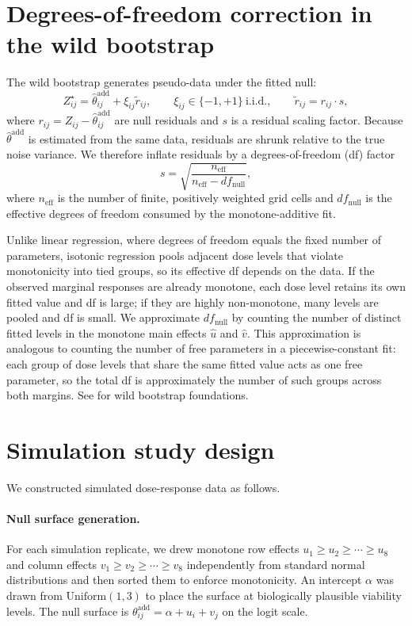 \documentclass[11pt]{article}
\begin{document}
\section{Degrees-of-freedom correction in the wild bootstrap}

The wild bootstrap generates pseudo-data under the fitted null:
\begin{equation}
Z^\star_{ij}=\hat\theta^{\mathrm{add}}_{ij}+\xi_{ij}\tilde r_{ij},\qquad
\xi_{ij}\in\{-1,+1\}\ \text{i.i.d.},\qquad
\tilde r_{ij}=r_{ij}\cdot s,
\end{equation}
where $r_{ij}=Z_{ij}-\hat\theta^{\mathrm{add}}_{ij}$ are null residuals and $s$ is a residual scaling factor.
Because $\hat\theta^{\mathrm{add}}$ is estimated from the same data, residuals are shrunk relative to the true noise variance.
We therefore inflate residuals by a degrees-of-freedom (df) factor
\begin{equation}
s=\sqrt{\frac{n_{\mathrm{eff}}}{n_{\mathrm{eff}}-df_{\mathrm{null}}}},
\end{equation}
where $n_{\mathrm{eff}}$ is the number of finite, positively weighted grid cells and $df_{\mathrm{null}}$ is the effective degrees of freedom consumed by the monotone-additive fit.

Unlike linear regression, where degrees of freedom equals the fixed number of parameters, isotonic regression pools adjacent dose levels that violate monotonicity into tied groups, so its effective df depends on the data.
If the observed marginal responses are already monotone, each dose level retains its own fitted value and df is large; if they are highly non-monotone, many levels are pooled and df is small.
We approximate $df_{\mathrm{null}}$ by counting the number of distinct fitted levels in the monotone main effects $\hat u$ and $\hat v$.
This approximation is analogous to counting the number of free parameters in a piecewise-constant fit: each group of dose levels that share the same fitted value acts as one free parameter, so the total df is approximately the number of such groups across both margins.
See \cite{Wu1986} for wild bootstrap foundations.

\section{Simulation study design}

We constructed simulated dose-response data as follows.

\paragraph{Null surface generation.}
For each simulation replicate, we drew monotone row effects $u_1 \ge u_2 \ge \cdots \ge u_8$ and column effects $v_1 \ge v_2 \ge \cdots \ge v_8$ independently from standard normal distributions and then sorted them to enforce monotonicity.
An intercept $\alpha$ was drawn from $\mathrm{Uniform}(1,3)$ to place the surface at biologically plausible viability levels.
The null surface is $\theta^{\mathrm{add}}_{ij} = \alpha + u_i + v_j$ on the logit scale.
\end{document}
